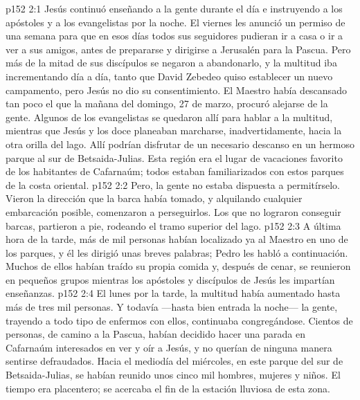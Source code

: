 \vs p152 2:1 Jesús continuó enseñando a la gente durante el día e instruyendo a los apóstoles y a los evangelistas por la noche. El viernes les anunció un permiso de una semana para que en esos días todos sus seguidores pudieran ir a casa o ir a ver a sus amigos, antes de prepararse y dirigirse a Jerusalén para la Pascua. Pero más de la mitad de sus discípulos se negaron a abandonarlo, y la multitud iba incrementando día a día, tanto que David Zebedeo quiso establecer un nuevo campamento, pero Jesús no dio su consentimiento. El Maestro había descansado tan poco el  que la mañana del domingo, 27 de marzo, procuró alejarse de la gente. Algunos de los evangelistas se quedaron allí para hablar a la multitud, mientras que Jesús y los doce planeaban marcharse, inadvertidamente, hacia la otra orilla del lago. Allí podrían disfrutar de un necesario descanso en un hermoso parque al sur de Betsaida\hyp{}Julias. Esta región era el lugar de vacaciones favorito de los habitantes de Cafarnaúm; todos estaban familiarizados con estos parques de la costa oriental.
\vs p152 2:2 Pero, la gente no estaba dispuesta a permitírselo. Vieron la dirección que la barca había tomado, y alquilando cualquier embarcación posible, comenzaron a perseguirlos. Los que no lograron conseguir barcas, partieron a pie, rodeando el tramo superior del lago.
\vs p152 2:3 A última hora de la tarde, más de mil personas habían localizado ya al Maestro en uno de los parques, y él les dirigió unas breves palabras; Pedro les habló a continuación. Muchos de ellos habían traído su propia comida y, después de cenar, se reunieron en pequeños grupos mientras los apóstoles y discípulos de Jesús les impartían enseñanzas.
\vs p152 2:4 El lunes por la tarde, la multitud había aumentado hasta más de tres mil personas. Y todavía ---hasta bien entrada la noche--- la gente, trayendo a todo tipo de enfermos con ellos, continuaba congregándose. Cientos de personas, de camino a la Pascua, habían decidido hacer una parada en Cafarnaúm interesados en ver y oír a Jesús, y no querían de ninguna manera sentirse defraudados. Hacia el mediodía del miércoles, en este parque del sur de Betsaida\hyp{}Julias, se habían reunido unos cinco mil hombres, mujeres y niños. El tiempo era placentero; se acercaba el fin de la estación lluviosa de esta zona.
